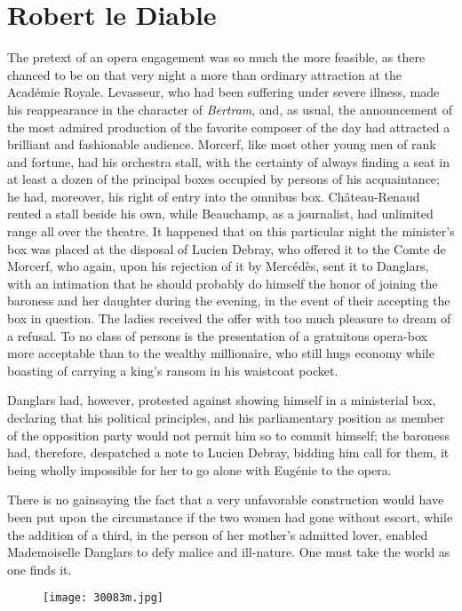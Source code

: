 \chapter{Robert le Diable}

The pretext of an opera engagement was so much the more feasible, as
there chanced to be on that very night a more than ordinary attraction
at the Académie Royale. Levasseur, who had been suffering under severe
illness, made his reappearance in the character of \textit{Bertram}, and, as
usual, the announcement of the most admired production of the favorite
composer of the day had attracted a brilliant and fashionable audience.
Morcerf, like most other young men of rank and fortune, had his
orchestra stall, with the certainty of always finding a seat in at
least a dozen of the principal boxes occupied by persons of his
acquaintance; he had, moreover, his right of entry into the omnibus
box. Château-Renaud rented a stall beside his own, while Beauchamp, as
a journalist, had unlimited range all over the theatre. It happened
that on this particular night the minister’s box was placed at the
disposal of Lucien Debray, who offered it to the Comte de Morcerf, who
again, upon his rejection of it by Mercédès, sent it to Danglars, with
an intimation that he should probably do himself the honor of joining
the baroness and her daughter during the evening, in the event of their
accepting the box in question. The ladies received the offer with too
much pleasure to dream of a refusal. To no class of persons is the
presentation of a gratuitous opera-box more acceptable than to the
wealthy millionaire, who still hugs economy while boasting of carrying
a king’s ransom in his waistcoat pocket.

Danglars had, however, protested against showing himself in a
ministerial box, declaring that his political principles, and his
parliamentary position as member of the opposition party would not
permit him so to commit himself; the baroness had, therefore,
despatched a note to Lucien Debray, bidding him call for them, it being
wholly impossible for her to go alone with Eugénie to the opera.

There is no gainsaying the fact that a very unfavorable construction
would have been put upon the circumstance if the two women had gone
without escort, while the addition of a third, in the person of her
mother’s admitted lover, enabled Mademoiselle Danglars to defy malice
and ill-nature. One must take the world as one finds it.

\begin{figure}[ht]
\texttt{[image: 30083m.jpg]}
\end{figure}

